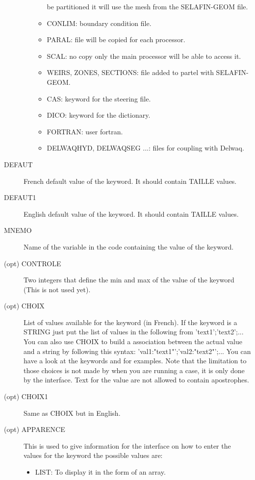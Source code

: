 \begin{description}
\begin{itemize}
\begin{itemize}
          be partitioned it will use the mesh from the SELAFIN-GEOM file.
        \item CONLIM: boundary condition file.
        \item PARAL: file will be copied for each processor.
        \item SCAL: no copy only the main processor will be able to access it.
        \item WEIRS, ZONES, SECTIONS: file added to partel with SELAFIN-GEOM.
        \item CAS: keyword for the steering file.
        \item DICO: keyword for the dictionary.
        \item FORTRAN: user fortran.
        \item DELWAQHYD, DELWAQSEG ...: files for coupling with Delwaq.
      \end{itemize}
  \end{itemize}
\item[DEFAUT] French default value of the keyword. It should contain TAILLE
  values.
\item[DEFAUT1] English default value of the keyword. It should contain TAILLE
  values.
\item[MNEMO] Name of the variable in the code containing the value of the keyword.
\item[(opt) CONTROLE] Two integers that define the min and max of the value of
  the keyword (This is not used yet).
\item[(opt) CHOIX] List of values available for the keyword (in French). If the
  keyword is a STRING just put the list of values in the following from
  'text1';'text2';...  You can also use CHOIX to build a association between
  the actual value and a string by following this syntax:
  'val1:"text1"';'val2:"text2"';... You can have a look at the keywords
   and  for examples.
  Note that the limitation to those choices is not made by \damocles when you
  are running a case, it is only done by the interface. Text for the value are
  not allowed to contain apostrophes.
\item[(opt) CHOIX1] Same as CHOIX but in English.
\item[(opt) APPARENCE] This is used to give information for the interface on
  how to enter the values for the keyword the possible values are:
  \begin{itemize}
    \item LIST: To display it in the form of an array.

\end{itemize}
\end{description}
